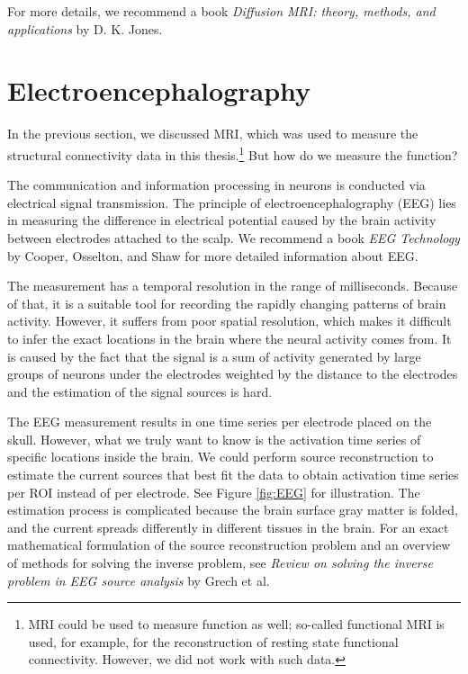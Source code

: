 For more details, we recommend a book \textit{Diffusion MRI: theory, methods, and applications} by D. K. Jones. \cite{jones_diffusion_2011}

\section{Electroencephalography}

In the previous section, we discussed MRI, which was used to measure the structural connectivity data in this thesis.\footnote{MRI could be used to measure function as well; so-called functional MRI is used, for example, for the reconstruction of resting state functional connectivity. However, we did not work with such data.} But how do we measure the function?

The communication and information processing in neurons is conducted via electrical signal transmission. The principle of electroencephalography (EEG) lies in measuring the difference in electrical potential caused by the brain activity between electrodes attached to the scalp. \cite{howseman_electroencephalographic_1999, st_louis_electroencephalography_2016, cooper_eeg_1974} We recommend a book \textit{EEG Technology} by Cooper, Osselton, and Shaw for more detailed information about EEG. \cite{cooper_eeg_1974}

The measurement has a temporal resolution in the range of milliseconds. Because of that, it is a suitable tool for recording the rapidly changing patterns of brain activity. However, it suffers from poor spatial resolution, which makes it difficult to infer the exact locations in the brain where the neural activity comes from. It is caused by the fact that the signal is a sum of activity generated by large groups of neurons under the electrodes weighted by the distance to the electrodes and the estimation of the signal sources is hard. \cite{howseman_electroencephalographic_1999, st_louis_electroencephalography_2016,michel_eeg_2019}

The EEG measurement results in one time series per electrode placed on the skull. However, what we truly want to know is the activation time series of specific locations inside the brain. We could perform source reconstruction to estimate the current sources that best fit the data to obtain activation time series per ROI instead of per electrode. See Figure \ref{fig:EEG} for illustration. The estimation process is complicated because the brain surface gray matter is folded, and the current spreads differently in different tissues in the brain. For an exact mathematical formulation of the source reconstruction problem and an overview of methods for solving the inverse problem, see \textit{Review on solving the inverse problem in EEG source analysis} by Grech et al. \cite{grech_review_2008}

